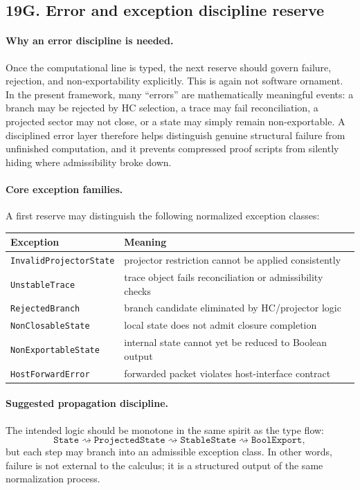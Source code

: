 \subsection*{19G. Error and exception discipline reserve}

\paragraph{Why an error discipline is needed.}
Once the computational line is typed, the next reserve should govern failure, rejection, and non-exportability explicitly. This is again not software ornament. In the present framework, many ``errors'' are mathematically meaningful events: a branch may be rejected by HC selection, a trace may fail reconciliation, a projected sector may not close, or a state may simply remain non-exportable. A disciplined error layer therefore helps distinguish genuine structural failure from unfinished computation, and it prevents compressed proof scripts from silently hiding where admissibility broke down.

\paragraph{Core exception families.}
A first reserve may distinguish the following normalized exception classes:
\begin{center}
\begin{tabular}{@{}ll@{}}
\toprule
Exception & Meaning \\
\midrule
\texttt{InvalidProjectorState} & projector restriction cannot be applied consistently \\
\texttt{UnstableTrace} & trace object fails reconciliation or admissibility checks \\
\texttt{RejectedBranch} & branch candidate eliminated by HC/projector logic \\
\texttt{NonClosableState} & local state does not admit closure completion \\
\texttt{NonExportableState} & internal state cannot yet be reduced to Boolean output \\
\texttt{HostForwardError} & forwarded packet violates host-interface contract \\
\bottomrule
\end{tabular}
\end{center}

\paragraph{Suggested propagation discipline.}
The intended logic should be monotone in the same spirit as the type flow:
\[
\texttt{State}
\rightsquigarrow
\texttt{ProjectedState}
\rightsquigarrow
\texttt{StableState}
\rightsquigarrow
\texttt{BoolExport},
\]
but each step may branch into an admissible exception class. In other words, failure is not external to the calculus; it is a structured output of the same normalization process.

